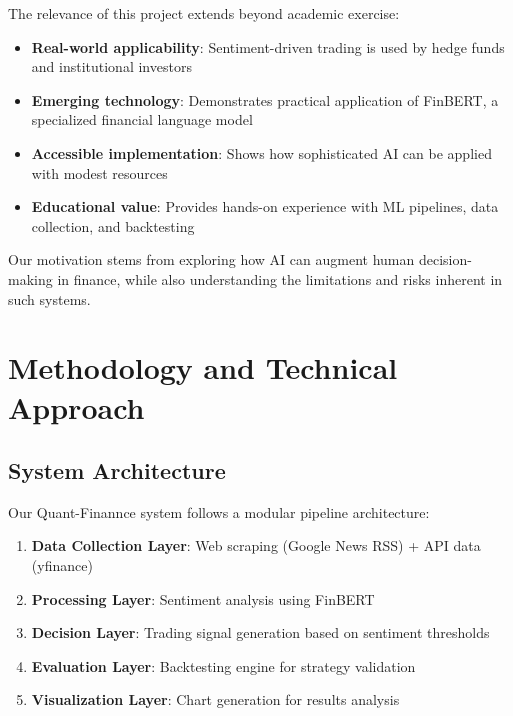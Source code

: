 \documentclass[12pt]{article}
\begin{document}
\vspace{\baselineskip}

The relevance of this project extends beyond academic exercise:

\begin{itemize}
\item \textbf{Real-world applicability}: Sentiment-driven trading is used by hedge funds and institutional investors
\item \textbf{Emerging technology}: Demonstrates practical application of FinBERT, a specialized financial language model
\item \textbf{Accessible implementation}: Shows how sophisticated AI can be applied with modest resources
\item \textbf{Educational value}: Provides hands-on experience with ML pipelines, data collection, and backtesting
\end{itemize}

Our motivation stems from exploring how AI can augment human decision-making in finance, while also understanding the limitations and risks inherent in such systems.

\section{Methodology and Technical Approach}

\subsection{System Architecture}

Our Quant-Finannce system follows a modular pipeline architecture:

\begin{enumerate}
\item \textbf{Data Collection Layer}: Web scraping (Google News RSS) + API data (yfinance)
\item \textbf{Processing Layer}: Sentiment analysis using FinBERT
\item \textbf{Decision Layer}: Trading signal generation based on sentiment thresholds
\item \textbf{Evaluation Layer}: Backtesting engine for strategy validation
\item \textbf{Visualization Layer}: Chart generation for results analysis
\end{enumerate}
\end{document}
